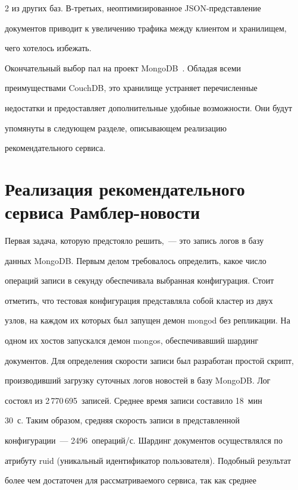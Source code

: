 \begin{multicols}{2}
из других баз. В-третьих, неоптимизированное JSON-представление 


документов приводит к увеличению трафика между клиентом и хранилищем, 


чего хотелось избежать.


 Окончательный выбор пал на проект MongoDB~\cite{9-kli}. Обладая всеми 


преимуществами CouchDB, это хранилище устраняет перечисленные 


недостатки и предоставляет дополнительные удобные возможности. Они будут 


упомянуты в следующем разделе, опи\-сы\-ва\-ющем реализацию 


рекомендательного сервиса.





\section{Реализация рекомендательного сервиса Рамблер-новости}


   


   Первая задача, которую предстояло решить,~--- это запись логов в базу 


данных MongoDB. Первым делом требовалось определить, какое число 


операций записи в секунду обеспечивала выбранная конфигурация. Стоит 


отметить, что тестовая конфигурация представляла собой кластер из двух 


узлов, на каждом их которых был запущен демон {\sf mongod} без репликации. На 


одном их хостов запускался демон mongos, обеспечивавший шардинг 


документов. Для определения скорости записи был разработан простой скрипт, 


производивший загрузку суточных логов новостей в базу MongoDB. Лог 


состоял из 2\,770\,695~записей. Среднее время записи составило 18~мин 


30~с. Таким образом, средняя скорость записи в представленной 


конфигурации~--- 2496~операций/с. Шардинг документов осуществлялся по 


атрибуту {\sf ruid} (уникальный идентификатор пользователя). Подобный результат 


более чем достаточен для рассматриваемого сервиса, так как среднее 



\end{multicols}
